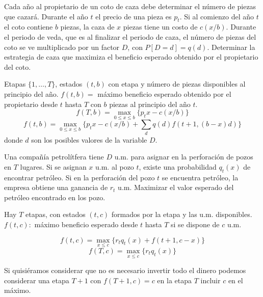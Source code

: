 \documentclass[twoside]{article}
\begin{document}
\newpage 
\begin{ejercicio}{2}
Cada año al propietario de un coto de caza debe determinar el número de piezas que cazará. Durante el año $t$ el precio de una pieza es $p_t$. Si al comienzo del año $t$ el coto contiene $b$ piezas, la caza de $x$ piezas tiene un costo de $c(x/b)$. Durante el periodo de veda, que es al finalizar el periodo de caza, el número de piezas del coto se ve multiplicado por un factor $D$, con $P[D=d]=q(d)$. Determinar la estrategia de caza que maximiza el beneficio esperado obtenido por el propietario del coto.


\begin{solucion}
Etapas $\{1,\dots, T\}$, estados $(t,b)$ con etapa y número de piezas disponibles al principio del año.
$f(t,b)=$ máximo beneficio esperado obtenido por el propietario desde $t$ hasta $T$ con $b$ piezas al principio del año $t$.
$$f(T,b)=\max_{0\leq x\leq b}\{p_tx-c(x/b)\}$$
$$f(t,b)=\max_{0\leq x\leq b}\{p_tx-c(x/b)+\sum_d q(d)f(t+1,(b-x)d)\}$$
donde $d$ son los posibles valores de la variable $D$. 
\end{solucion}

\end{ejercicio}

\newpage 
\begin{ejercicio}{3}
Una compañía petrolítfera tiene $D$ u.m. para asignar en la perforación de pozos en $T$ lugares. Si se asignan $x$ u.m. al pozo $t$, existe una probabilidad $q_t(x)$ de encontrar petróleo. Si en la perforación del pozo $t$ se encuentra petróleo, la empresa obtiene una ganancia de $r_t$ u.m. Maximizar el valor esperado del petróleo encontrado en los pozo.
\begin{solucion}
Hay $T$ etapas, con estados $(t,c)$ formados por la etapa y las u.m. disponibles. $f(t,c):$ máximo beneficio esperado desde $t$ hasta $T$ si se dispone de $c$ u.m.  

$$f(t,c)=\max_{x\leq c}\{r_tq_t(x)+f(t+1,c-x)\}$$
$$f(T,c)=\max_{x\leq c}\{r_tq_t(x)\}$$

Si quisiéramos considerar que no es necesario invertir todo el dinero podemos considerar una etapa $T+1$ con $f(T+1,c)=c$ en la etapa $T$ incluir $c$ en el máximo. 







\end{solucion}
\end{ejercicio}	
\end{document}
